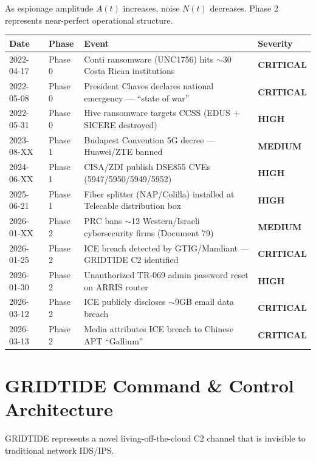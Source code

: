 \documentclass[11pt,a4paper]{article}
\begin{document}
As espionage amplitude $A(t)$ increases, noise $N(t)$ decreases. Phase 2 represents near-perfect operational structure.

\begin{longtable}{p{2.2cm}p{1.5cm}p{7cm}p{2cm}}
\toprule
\textbf{Date} & \textbf{Phase} & \textbf{Event} & \textbf{Severity} \\
\midrule
\endhead
2022-04-17 & Phase 0 & Conti ransomware (UNC1756) hits $\sim$30 Costa Rican institutions & \textcolor{critred}{\textbf{CRITICAL}} \\
2022-05-08 & Phase 0 & President Chaves declares national emergency — ``state of war'' & \textcolor{critred}{\textbf{CRITICAL}} \\
2022-05-31 & Phase 0 & Hive ransomware targets CCSS (EDUS + SICERE destroyed) & \textcolor{highorange}{\textbf{HIGH}} \\
2023-08-XX & Phase 1 & Budapest Convention 5G decree — Huawei/ZTE banned & \textcolor{medyellow}{\textbf{MEDIUM}} \\
2024-06-XX & Phase 1 & CISA/ZDI publish DSE855 CVEs (5947/5950/5949/5952) & \textcolor{highorange}{\textbf{HIGH}} \\
2025-06-21 & Phase 1 & Fiber splitter (NAP/Colilla) installed at Telecable distribution box & \textcolor{highorange}{\textbf{HIGH}} \\
2026-01-XX & Phase 2 & PRC bans $\sim$12 Western/Israeli cybersecurity firms (Document 79) & \textcolor{medyellow}{\textbf{MEDIUM}} \\
2026-01-25 & Phase 2 & ICE breach detected by GTIG/Mandiant — GRIDTIDE C2 identified & \textcolor{critred}{\textbf{CRITICAL}} \\
2026-01-30 & Phase 2 & Unauthorized TR-069 admin password reset on ARRIS router & \textcolor{highorange}{\textbf{HIGH}} \\
2026-03-12 & Phase 2 & ICE publicly discloses $\sim$9GB email data breach & \textcolor{critred}{\textbf{CRITICAL}} \\
2026-03-13 & Phase 2 & Media attributes ICE breach to Chinese APT ``Gallium'' & \textcolor{critred}{\textbf{CRITICAL}} \\
\bottomrule
\end{longtable}

\section{GRIDTIDE Command \& Control Architecture}

GRIDTIDE represents a novel living-off-the-cloud C2 channel that is invisible to traditional network IDS/IPS.
\end{document}

